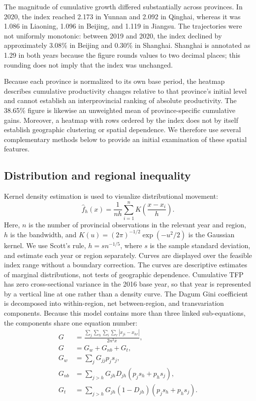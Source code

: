 \documentclass[sustainability,article,submit,moreauthors]{Definitions/mdpi}
\numberwithin{equation}{section}
\begin{document}
The magnitude of cumulative growth differed substantially across
provinces. In 2020, the index reached 2.173 in Yunnan and 2.092 in Qinghai,
whereas it was 1.086 in Liaoning, 1.096 in Beijing, and 1.119 in Jiangsu.
The trajectories were not uniformly monotonic: between 2019 and 2020,
the index declined by approximately 3.08\% in Beijing and 0.30\% in
Shanghai. Shanghai is annotated as 1.29 in both years because the figure
rounds values to two decimal places; this rounding does not imply that
the index was unchanged.

Because each province is normalized to its own base period, the heatmap
describes cumulative productivity changes relative to that province's
initial level and cannot establish an interprovincial ranking of absolute
productivity. The 38.65\% figure is likewise an unweighted mean of
province-specific cumulative gains. Moreover, a heatmap with rows ordered
by the index does not by itself establish geographic clustering or spatial
dependence. We therefore use several complementary methods below to
provide an initial examination of these spatial features.

\subsection{Distribution and regional inequality}

Kernel density estimation is used to visualize distributional movement:
\begin{equation}
\widehat f_h(x)=\frac{1}{nh}\sum_{i=1}^{n}K\left(\frac{x-x_i}{h}\right).
\label{eq:kde}
\end{equation}
Here, $n$ is the number of provincial observations in the relevant year and
region, $h$ is the bandwidth, and $K(u)=(2\pi)^{-1/2}\exp(-u^2/2)$ is the
Gaussian kernel. We use Scott's rule, $h=s n^{-1/5}$, where $s$ is the sample
standard deviation, and estimate each year or region separately. Curves are
displayed over the feasible index range without a boundary correction.
The curves are descriptive estimates of marginal
distributions, not tests of geographic dependence. Cumulative TFP has zero
cross-sectional variance in the 2016 base year, so that year is represented
by a vertical line at one rather than a density curve.
The Dagum Gini coefficient \cite{dagum1997} is decomposed into within-region, net between-region, and transvariation components. Because this model contains more than three linked sub-equations, the components share one equation number:
\begin{equation}
\begin{aligned}
G&=\frac{\sum_j\sum_h\sum_i\sum_r|x_{ji}-x_{hr}|}{2n^2\bar x},\\
G&=G_w+G_{nb}+G_t,\\
G_w&=\sum_jG_{jj}p_js_j,\\
G_{nb}&=\sum_{j>h}G_{jh}D_{jh}(p_js_h+p_hs_j),\\
G_t&=\sum_{j>h}G_{jh}(1-D_{jh})(p_js_h+p_hs_j).
\end{aligned}
\label{eq:dagum}
\end{equation}
\end{document}
